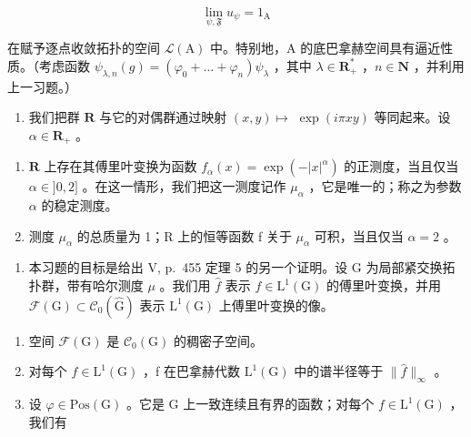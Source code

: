 \[
\lim _ {\psi , \mathfrak {F}} u _ {\psi} = 1 _ {\mathrm{A}}
\]

在赋予逐点收敛拓扑的空间 \(\mathcal{L}(\mathrm{A})\) 中。特别地，A 的底巴拿赫空间具有逼近性质。（考虑函数 \(\psi_{\lambda,n}(g) = (\varphi_0 + \dots + \varphi_n)\psi_\lambda\) ，其中 \(\lambda \in \mathbf{R}_+^*\) ，\(n \in \mathbf{N}\) ，并利用上一习题。）

\begin{enumerate}
\def\labelenumi{\arabic{enumi})}
\setcounter{enumi}{7}
\tightlist
\item
  我们把群 \(\mathbf{R}\) 与它的对偶群通过映射 \((x,y)\mapsto\) \(\exp (i\pi xy)\) 等同起来。设 \(\alpha \in \mathbf{R}_{+}\) 。
\end{enumerate}

\begin{enumerate}
\def\labelenumi{\alph{enumi})}
\item
  \(\mathbf{R}\) 上存在其傅里叶变换为函数 \(f_{\alpha}(x) = \exp(-|x|^{\alpha})\) 的正测度，当且仅当 \(\alpha \in ]0,2]\) 。在这一情形，我们把这一测度记作 \(\mu_{\alpha}\) ，它是唯一的；称之为参数 \(\alpha\) 的稳定测度。
\item
  测度 \(\mu_{\alpha}\) 的总质量为 1；R 上的恒等函数 f 关于 \(\mu_{\alpha}\) 可积，当且仅当 \(\alpha = 2\) 。
\end{enumerate}

\begin{enumerate}
\def\labelenumi{\arabic{enumi})}
\setcounter{enumi}{8}
\tightlist
\item
  本习题的目标是给出 V, p.~455 定理 5 的另一个证明。设 G 为局部紧交换拓扑群，带有哈尔测度 \(\mu\) 。我们用 \(\widehat{f}\) 表示 \(f \in \mathrm{L}^1(\mathrm{G})\) 的傅里叶变换，并用 \(\mathcal{F}(\mathrm{G}) \subset \mathcal{C}_0(\widehat{\mathrm{G}})\) 表示 \(\mathrm{L}^1(\mathrm{G})\) 上傅里叶变换的像。
\end{enumerate}

\begin{enumerate}
\def\labelenumi{\alph{enumi})}
\item
  空间 \(\mathcal{F}(\mathrm{G})\) 是 \(\mathcal{C}_0(\mathrm{G})\) 的稠密子空间。
\item
  对每个 \(f \in \mathrm{L}^{1}(\mathrm{G})\) ，f 在巴拿赫代数 \(\mathrm{L}^{1}(\mathrm{G})\) 中的谱半径等于 \(\|\widehat{f}\|_{\infty}\) 。
\item
  设 \(\varphi\in\mathrm{Pos}(\mathrm{G})\) 。它是 \(\mathrm{G}\) 上一致连续且有界的函数；对每个 \(f\in\mathrm{L}^{1}(\mathrm{G})\) ，我们有
\end{enumerate}


